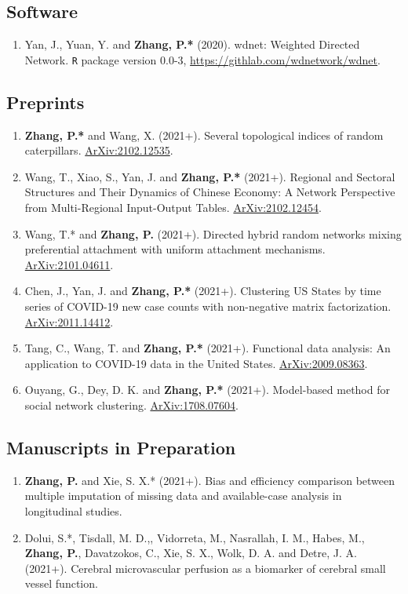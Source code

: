 \documentclass[margin]{res}
\begin{document}
\begin{resume}
\subsection{Software}
\begin{enumerate}
	\item {\sc Yan, J., Yuan, Y.} and {\bf Zhang, P.*} (2020). 
	wdnet: Weighted Directed Network. {\tt R} package version 0.0-3, 
	\url{https://githlab.com/wdnetwork/wdnet}.
\end{enumerate}

\subsection{Preprints}
\begin{enumerate}
	\item {\bf Zhang, P.*} and {\sc Wang, X.} (2021+). Several 
	topological indices of random caterpillars. 
	\href{https://arxiv.org/pdf/2102.12535.pdf}{ArXiv:2102.12535}.
	\item {\sc Wang, T., Xiao, S., Yan, J.} and {\bf Zhang, P.*} 
	(2021+). Regional and Sectoral Structures and Their Dynamics of
	Chinese Economy: A Network Perspective from
	Multi-Regional Input-Output Tables. 
	\href{https://arxiv.org/pdf/2102.12454.pdf}{ArXiv:2102.12454}. 
	\item {\sc Wang, T.*} and {\bf Zhang, P.} (2021+). Directed 
	hybrid random 
	networks mixing preferential attachment with uniform attachment 
	mechanisms. 
	\href{https://arxiv.org/pdf/2101.04611.pdf}{ArXiv:2101.04611}.
	\item {\sc Chen, J., Yan, J.} and {\bf Zhang, P.*} (2021+). 
	Clustering US States by time series of COVID-19 new case counts 
	with non-negative matrix factorization. 
	\href{https://arxiv.org/pdf/2011.14412.pdf}{ArXiv:2011.14412}.
	\item {\sc Tang, C., Wang, T.} and {\bf Zhang, P.*} (2021+). 
	Functional data analysis: An application to COVID-19 data in
	the United States. 
	\href{https://arxiv.org/pdf/2009.08363.pdf}{ArXiv:2009.08363}.
	\item {\sc Ouyang, G., Dey, D. K.} and {\bf Zhang, P.*} (2021+). 
	Model-based method for social network clustering. 
	\href{https://arxiv.org/pdf/1708.07604.pdf}{ArXiv:1708.07604}.
\end{enumerate}

\subsection{Manuscripts in Preparation}
\begin{enumerate}
	\item {\bf Zhang, P.} and {\sc Xie, S. X.*} (2021+). Bias 
	and efficiency comparison between multiple imputation of missing 
	data and available-case analysis in longitudinal studies. 
	\item {\sc Dolui, S.*, Tisdall, M. D.,, Vidorreta, M., 
	Nasrallah, I. M., Habes, M.}, {\bf Zhang, P.}, {\sc 
	Davatzokos, C., Xie, S. X., Wolk, D. A.} and {\sc Detre, J. A.} 
	(2021+). Cerebral microvascular perfusion as a biomarker of 
	cerebral small vessel function.
\end{enumerate}


\end{resume}
\end{document}
